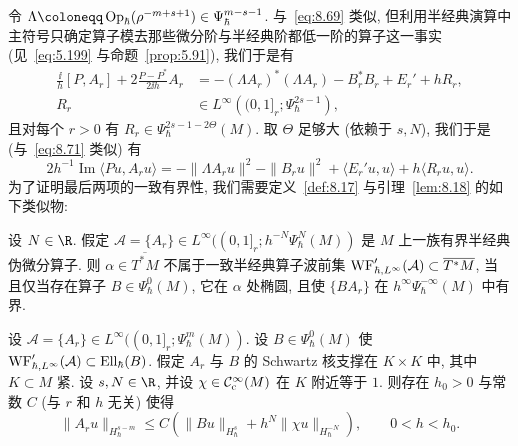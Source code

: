 令 $\Lambda \defeq \Op_\hbar(\rho^{-m+s+1}) \in \Psi_\hbar^{m-s-1}$. 与~\eqref{eq:8.69} 类似, 但利用半经典演算中主符号只确定算子模去那些微分阶与半经典阶都低一阶的算子这一事实 (见~\eqref{eq:5.199} 与命题~\ref{prop:5.91}), 我们于是有
\begin{equation}\label{eq:8.109}
    \begin{aligned}
        \frac{\ii}{h}[P, A_r] + 2\frac{P - P^*}{2\ii h}A_r &= -(\Lambda A_r)^*(\Lambda A_r) - B_r^*B_r + E_r' + hR_r, \\
        R_r &\in L^\infty\left( (0, 1]_r; \Psi_\hbar^{2s-1} \right),
    \end{aligned}
\end{equation}
且对每个 $r > 0$ 有 $R_r \in \Psi_\hbar^{2s-1-2\Theta}(M)$. 取 $\Theta$ 足够大 (依赖于 $s, N$), 我们于是 (与~\eqref{eq:8.71} 类似) 有
\begin{equation}\label{eq:8.110}
    2h^{-1}\operatorname{Im}\langle P u, A_r u \rangle = -\| \Lambda A_r u \|^2 - \| B_r u \|^2 + \langle E_r' u, u \rangle + h\langle R_r u, u \rangle.
\end{equation}
为了证明最后两项的一致有界性, 我们需要定义~\ref{def:8.17} 与引理~\ref{lem:8.18} 的如下类似物:

\begin{definition}[一致半经典算子波前集]\label{def:8.28}
设 $N \in \R$. 假定 $\mathcal{A} = \{A_r\} \in L^\infty((0, 1]_r; h^{-N}\Psi_\hbar^N(M))$ 是 $M$ 上一族有界半经典伪微分算子. 则 $\alpha \in \overline{T^*M}$ 不属于一致半经典算子波前集 $\operatorname{WF}_{\hbar, L^\infty}'(\mathcal{A}) \subset \overline{T^*M}$, 当且仅当存在算子 $B \in \Psi_\hbar^0(M)$, 它在 $\alpha$ 处椭圆, 且使 $\{BA_r\}$ 在 $h^\infty\Psi_\hbar^{-\infty}(M)$ 中有界.
\end{definition}

\begin{lemma}[一致半经典微局部椭圆正则性]\label{lem:8.29}
设 $\mathcal{A} = \{A_r\} \in L^\infty((0, 1]_r; \Psi_\hbar^m(M))$. 设 $B \in \Psi_\hbar^0(M)$ 使 $\operatorname{WF}_{\hbar, L^\infty}'(\mathcal{A}) \subset \operatorname{Ell}_\hbar(B)$. 假定 $A_r$ 与 $B$ 的 Schwartz 核支撑在 $K \times K$ 中, 其中 $K \subset M$ 紧. 设 $s, N \in \R$, 并设 $\chi \in \mathcal{C}_{\mathrm{c}}^\infty(M)$ 在 $K$ 附近等于 $1$. 则存在 $h_0 > 0$ 与常数 $C$ (与 $r$ 和 $h$ 无关) 使得
\begin{equation}\label{eq:8.111}
    \| A_r u \|_{H_\hbar^{s-m}} \le C\left( \| B u \|_{H_\hbar^s} + h^N \| \chi u \|_{H_\hbar^{-N}} \right), \qquad 0 < h < h_0.
\end{equation}
\end{lemma}

